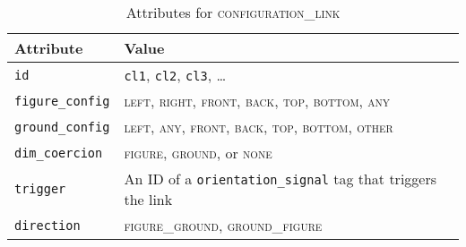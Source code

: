 \documentclass[11pt]{article}
\newenvironment{attributes}
{
\begin{tabular}{|l|l|}
    \hline \textbf{Attribute} & \textbf{Value}\\
}
{   \hline
\end{tabular}
}
\begin{document}
\iffalse
\eenumsentence{
    \item The man saw the dog through the window.
    \label{ex:blah}
    \item The man saw the dog staring at him through the window.
    \label{ex:blag}
}\label{ex:configuration_links}
\fi

\begin{table}[h]
\centering
\begin{attributes}
    \hline \texttt{id}                  & \texttt{cl1}, \texttt{cl2}, 
                                          \texttt{cl3}, \ldots\\
    \hline \texttt{figure\_config}      & \textsc{left}, \textsc{right}, \textsc{front}, \textsc{back}, \textsc{top}, \textsc{bottom}, \textsc{any}\\
    \hline \texttt{ground\_config}      & \textsc{left}, \textsc{any}, \textsc{front}, \textsc{back}, \textsc{top}, \textsc{bottom}, \textsc{other}\\
    \hline \texttt{dim\_coercion}            & \textsc{figure}, \textsc{ground}, or \textsc{none}\\
    \hline \texttt{trigger}             & An ID of a \texttt{orientation\_signal} tag that triggers the link\\
    \hline \texttt{direction}           & \textsc{figure\_ground}, \textsc{ground\_figure}\\
\end{attributes}
\caption{Attributes for \textsc{configuration\_link}}
\label{tab:configuration_link}
\end{table}


\break



\end{document}
